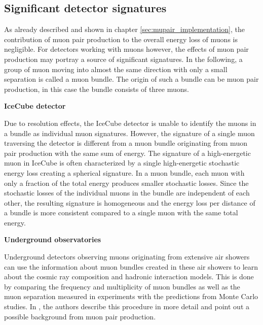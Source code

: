 \subsection{Significant detector signatures}
\label{sec:signatures}

As already described and shown in chapter \ref{sec:mupair_implementation}, the contribution of muon pair production to the overall energy loss of muons is negligible.
For detectors working with muons however, the effects of muon pair production may portray a source of significant signatures.
In the following, a group of muon moving into almost the same direction with only a small separation is called a muon bundle.
The origin of such a bundle can be muon pair production, in this case the bundle consists of three muons.

\textbf{IceCube detector}

Due to resolution effects, the IceCube detector is unable to identify the muons in a bundle as individual muon signatures.
However, the signature of a single muon traversing the detector is different from a muon bundle originating from muon pair production with the same sum of energy.
The signature of a high-energetic muon in IceCube is often characterized by a single high-energetic stochastic energy loss creating a spherical signature.
In a muon bundle, each muon with only a fraction of the total energy produces smaller stochastic losses.
Since the stochastic losses of the individual muons in the bundle are independent of each other, the resulting signature is homogeneous and the energy loss per distance of a bundle is more consistent compared to a single muon with the same total energy. 

\textbf{Underground observatories}

Underground detectors observing muons originating from extensive air showers can use the information about muon bundles created in these air showers to learn about the cosmic ray composition and hadronic interaction models.
This is done by comparing the frequency and multiplicity of muon bundles as well as the muon separation measured in experiments with the predictions from Monte Carlo studies.
In \cite{MupairInRock}, the authors describe this procedure in more detail and point out a possible background from muon pair production.

